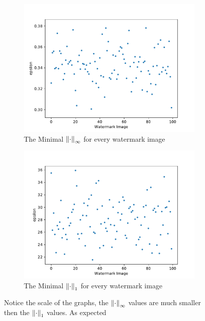 \documentclass[a4paper]{llncs}
\begin{document}
\begin{figure}[h!]
  \centering
  \begin{subfigure}{0.4\linewidth}
    \includegraphics[width=\linewidth]{../data/results/problem3/mnist_w_wm.pdf}
     \caption{The Minimal $\left\lVert\cdot\right\rVert_{\infty}$ for every watermark image}
  \end{subfigure}
  \begin{subfigure}{0.4\linewidth}
    \includegraphics[width=\linewidth]{../data/results/problem2/mnist_w_wm.pdf}
    \caption{The Minimal $\left\lVert\cdot\right\rVert_1$ for every watermark image}
  \end{subfigure}
  \label{fig:minimalEpsilonSingle}
  \caption{Notice the scale of the graphs, the $\left\lVert\cdot\right\rVert_\infty$ values are much smaller then the $\left\lVert\cdot\right\rVert_1$ values. As expected}
\end{figure}
\end{document}
